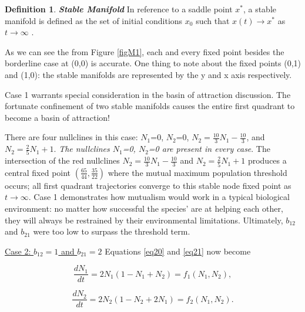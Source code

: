 \documentclass[11pt,a4paper]{scrartcl}
\theoremstyle{definition}
\newtheorem*{definition}{Definition}
\begin{document}
\begin{definition}{\textbf{\textit{Stable Manifold}}}
\newline
In reference to a saddle point $x^*$, a stable manifold is defined as the set of initial conditions $x_0$ such that $x(t) \rightarrow x^{*}$ as $
t \rightarrow \infty$ \cite{main}.
\end{definition}

As we can see the from Figure \ref{figM1}, each and every fixed point besides the borderline case at (0,0) is accurate. One thing to note about the fixed points (0,1) and (1,0): the stable manifolds are represented by the y and x axis respectively.\newline

Case 1 warrants special consideration in the basin of attraction discussion. The fortunate confinement of two stable manifolds causes the entire first quadrant to become a basin of attraction!\newline

There are four nullclines in this case: $N_1$=0, $N_2$=0,  $N_2=\frac{10}{3}N_1-\frac{10}{3}$, and  $N_2=\frac{2}{5}N_1+1$. \textit{The nullclines $N_1$=0, $N_2$=0 are present in every case}. The intersection of the red nullclines $N_2=\frac{10}{3}N_1-\frac{10}{3}$ and $N_2=\frac{2}{5}N_1+1$ produces a central fixed point $(\frac{65}{44},\frac{35}{22})$ where the mutual maximum population threshold occurs; all first quadrant trajectories converge to this stable node fixed point as $t \rightarrow \infty$. Case 1 demonstrates how mutualism would work in a typical biological environment: no matter how successful the species' are at helping each other, they will always be restrained by their environmental limitations. Ultimately, $b_{12}$ and $b_{21}$ were too low to surpass the threshold term.\newline

\underline{Case 2: $b_{12} = 1$ and $b_{21} = 2$}
\newline\newline
Equations \eqref{eq20} and \eqref{eq21} now become 

\begin{equation} \label{eq24}
	\frac{dN_1}{dt}=2N_1(1-N_1+N_2)=f_1(N_1, N_2),
\end{equation}

\begin{equation} \label{eq25}
	\frac{dN_2}{dt}=2N_2(1-N_2+2N_1)=f_2(N_1, N_2).
\end{equation}
\end{document}
